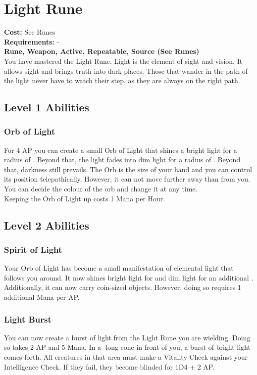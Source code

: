 \twocolumn
\section{Light Rune}\label{rune:light}
\textbf{Cost:} See Runes\\
\textbf{Requirements:} -\\
\textbf{Rune, Weapon, Active, Repeatable, Source (See Runes)}\\
You have mastered the Light Rune.
Light is the element of sight and vision.
It allows sight and brings truth into dark places. Those that wander in the path of the light never have to watch their step, as they are always on the right path.
\subsection{Level 1 Abilities}

\subsubsection{Orb of Light}
For 4 AP you can create a small Orb of Light that shines a bright light for a radius of . Beyond that, the light fades into dim light for a radius of . Beyond that, darkness still prevails. The Orb is the size of your hand and you can control its position telepathically. However, it can not move further away than  from you. You can decide the colour of the orb and change it at any time. \\
Keeping the Orb of Light up costs 1 Mana per Hour.


\subsection{Level 2 Abilities}

\subsubsection{Spirit of Light}
Your Orb of Light has become a small manifestation of elemental light that follows you around. It now shines bright light for  and dim light for an additional .\\
Additionally, it can now carry coin-sized objects. However, doing so requires 1 additional Mana per AP.

\subsubsection{Light Burst}
You can now create a burst of light from the Light Rune you are wielding. Doing so takes 2 AP and 5 Mana. In a -long cone in front of you, a burst of bright light comes forth. All creatures in that area must make a Vitality Check against your Intelligence Check. If they fail, they become blinded for 1D4 + 2 AP.

